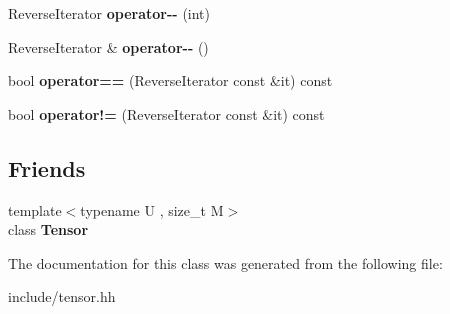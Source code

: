 \begin{DoxyCompactItemize}
\item 
Reverse\+Iterator {\bfseries operator-\/-\/} (int)\hypertarget{classtensor_1_1Tensor_3_01T_00_010_01_4_1_1ReverseIterator_a893ddb04b0a63ebe015f2e10f5eefcad}{}\label{classtensor_1_1Tensor_3_01T_00_010_01_4_1_1ReverseIterator_a893ddb04b0a63ebe015f2e10f5eefcad}

\item 
Reverse\+Iterator \& {\bfseries operator-\/-\/} ()\hypertarget{classtensor_1_1Tensor_3_01T_00_010_01_4_1_1ReverseIterator_a6b48b4dca0255d485459abd6d42f8e31}{}\label{classtensor_1_1Tensor_3_01T_00_010_01_4_1_1ReverseIterator_a6b48b4dca0255d485459abd6d42f8e31}

\item 
bool {\bfseries operator==} (Reverse\+Iterator const \&it) const \hypertarget{classtensor_1_1Tensor_3_01T_00_010_01_4_1_1ReverseIterator_a823566117141a350d5c1a4302b6b37df}{}\label{classtensor_1_1Tensor_3_01T_00_010_01_4_1_1ReverseIterator_a823566117141a350d5c1a4302b6b37df}

\item 
bool {\bfseries operator!=} (Reverse\+Iterator const \&it) const \hypertarget{classtensor_1_1Tensor_3_01T_00_010_01_4_1_1ReverseIterator_a88f25e2a8b64657ec54ab1ac3bb6d786}{}\label{classtensor_1_1Tensor_3_01T_00_010_01_4_1_1ReverseIterator_a88f25e2a8b64657ec54ab1ac3bb6d786}

\end{DoxyCompactItemize}
\subsection*{Friends}
\begin{DoxyCompactItemize}
\item 
{\footnotesize template$<$typename U , size\+\_\+t M$>$ }\\class {\bfseries Tensor}\hypertarget{classtensor_1_1Tensor_3_01T_00_010_01_4_1_1ReverseIterator_af4a07134de1525172d3c60c57e8f1496}{}\label{classtensor_1_1Tensor_3_01T_00_010_01_4_1_1ReverseIterator_af4a07134de1525172d3c60c57e8f1496}

\end{DoxyCompactItemize}


The documentation for this class was generated from the following file\+:\begin{DoxyCompactItemize}
\item 
include/tensor.\+hh\end{DoxyCompactItemize}
